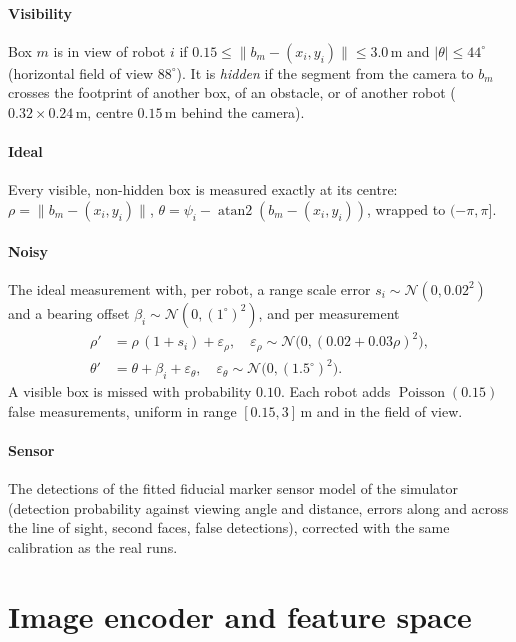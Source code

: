 \documentclass[conference]{IEEEtran}
\begin{document}
\paragraph{Visibility} Box $m$ is in view of robot $i$ if $0.15\le\|b_m-(x_i,y_i)\|\le3.0$\,m and
$|\theta|\le44^\circ$ (horizontal field of view $88^\circ$). It is \emph{hidden} if the segment from the camera to
$b_m$ crosses the footprint of another box, of an obstacle, or of another robot ($0.32\times0.24$\,m, centre
$0.15$\,m behind the camera).

\paragraph{Ideal} Every visible, non-hidden box is measured exactly at its centre:
$\rho=\|b_m-(x_i,y_i)\|$, $\theta=\psi_i-\operatorname{atan2}(b_m-(x_i,y_i))$, wrapped to $(-\pi,\pi]$.

\paragraph{Noisy} The ideal measurement with, per robot, a range scale error $s_i\sim\mathcal N(0,0.02^2)$ and a
bearing offset $\beta_i\sim\mathcal N(0,(1^\circ)^2)$, and per measurement
\begin{align}
\rho' &= \rho\,(1+s_i)+\varepsilon_\rho,\quad \varepsilon_\rho\sim\mathcal N\bigl(0,(0.02+0.03\rho)^2\bigr),\\
\theta' &= \theta+\beta_i+\varepsilon_\theta,\quad \varepsilon_\theta\sim\mathcal N\bigl(0,(1.5^\circ)^2\bigr).
\end{align}
A visible box is missed with probability $0.10$. Each robot adds $\operatorname{Poisson}(0.15)$ false measurements,
uniform in range $[0.15,3]$\,m and in the field of view.

\paragraph{Sensor} The detections of the fitted fiducial marker sensor model of the simulator (detection probability
against viewing angle and distance, errors along and across the line of sight, second faces, false detections),
corrected with the same calibration as the real runs.

\section{Image encoder and feature space}
\end{document}
